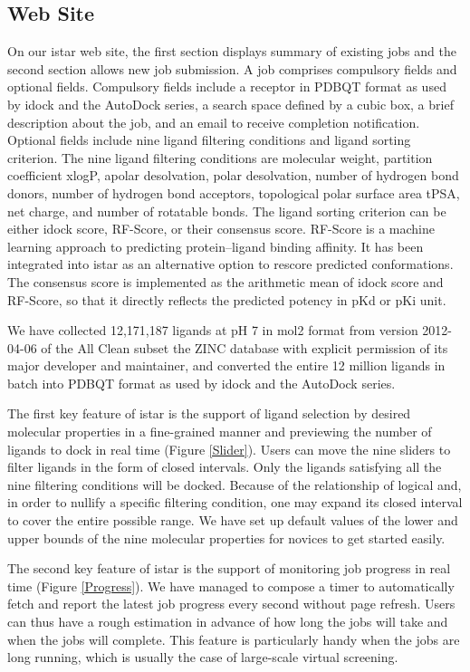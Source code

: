 \documentclass[10pt]{article}
\begin{document}
\subsection*{Web Site}
On our istar web site, the first section displays summary of existing jobs and the second section allows new job submission. A job comprises compulsory fields and optional fields. Compulsory fields include a receptor in PDBQT format as used by idock and the AutoDock series, a search space defined by a cubic box, a brief description about the job, and an email to receive completion notification. Optional fields include nine ligand filtering conditions and ligand sorting criterion. The nine ligand filtering conditions are molecular weight, partition coefficient xlogP, apolar desolvation, polar desolvation, number of hydrogen bond donors, number of hydrogen bond acceptors, topological polar surface area tPSA, net charge, and number of rotatable bonds. The ligand sorting criterion can be either idock score, RF-Score, or their consensus score. RF-Score \cite{564} is a machine learning approach to predicting protein–ligand binding affinity. It has been integrated into istar as an alternative option to rescore predicted conformations. The consensus score is implemented as the arithmetic mean of idock score and RF-Score, so that it directly reflects the predicted potency in pKd or pKi unit.

We have collected 12,171,187 ligands at pH 7 in mol2 format from version 2012-04-06 of the All Clean subset the ZINC database \cite{532,1178} with explicit permission of its major developer and maintainer, and converted the entire 12 million ligands in batch into PDBQT format as used by idock and the AutoDock series.

The first key feature of istar is the support of ligand selection by desired molecular properties in a fine-grained manner and previewing the number of ligands to dock in real time (Figure \ref{Slider}). Users can move the nine sliders to filter ligands in the form of closed intervals. Only the ligands satisfying all the nine filtering conditions will be docked. Because of the relationship of logical and, in order to nullify a specific filtering condition, one may expand its closed interval to cover the entire possible range. We have set up default values of the lower and upper bounds of the nine molecular properties for novices to get started easily.

The second key feature of istar is the support of monitoring job progress in real time (Figure \ref{Progress}). We have managed to compose a timer to automatically fetch and report the latest job progress every second without page refresh. Users can thus have a rough estimation in advance of how long the jobs will take and when the jobs will complete. This feature is particularly handy when the jobs are long running, which is usually the case of large-scale virtual screening.
\end{document}

